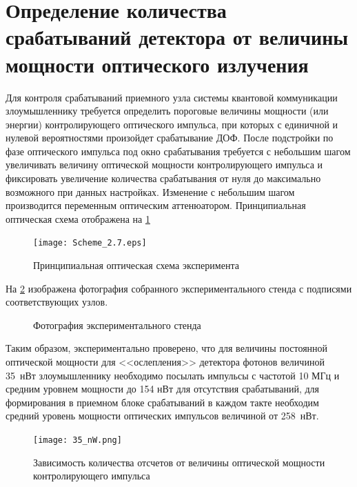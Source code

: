 \section{Определение количества срабатываний детектора от величины мощности оптического излучения} \label{sec:ch2/sec7}

Для контроля срабатываний приемного узла системы квантовой коммуникации злоумышленнику требуется определить пороговые величины мощности (или энергии) контролирующего оптического импульса, при которых с единичной и нулевой вероятностями произойдет срабатывание ДОФ. После подстройки по фазе оптического импульса под окно срабатывания требуется с небольшим шагом увеличивать величину оптической мощности контролирующего импульса и фиксировать увеличение количества срабатывания от нуля до максимально возможного при данных настройках. Изменение с небольшим шагом производится переменным оптическим аттенюатором. Принципиальная оптическая схема отображена на \ref{fig:Scheme_2.7}   
 \begin{figure}[ht]
  \centering
  \texttt{[image: Scheme\_2.7.eps]}
  \caption{Принципиальная оптическая схема эксперимента}
  \label{fig:Scheme_2.7}
\end{figure}

На \ref{fig:experimental_setup} изображена фотография собранного экспериментального стенда с подписями соответствующих узлов. 

 \begin{figure}[ht]
  \centering
  \caption{Фотография экспериментального стенда}
  \label{fig:experimental_setup}
\end{figure}

Таким образом, экспериментально проверено, что для величины постоянной оптической мощности для <<ослепления>> детектора фотонов величиной 35~нВт злоумышленнику необходимо посылать импульсы с частотой 10 МГц и средним уровнем мощности до 154 нВт для отсутствия срабатываний, для формирования в приемном блоке срабатываний в каждом такте необходим средний уровень мощности оптических импульсов величиной от 258~нВт.   
 \begin{figure}[ht]
  \centering
  \texttt{[image: 35\_nW.png]}
  \caption{Зависимость количества отсчетов от величины оптической мощности контролирующего импульса}
  \label{fig:35_nW}
\end{figure}




